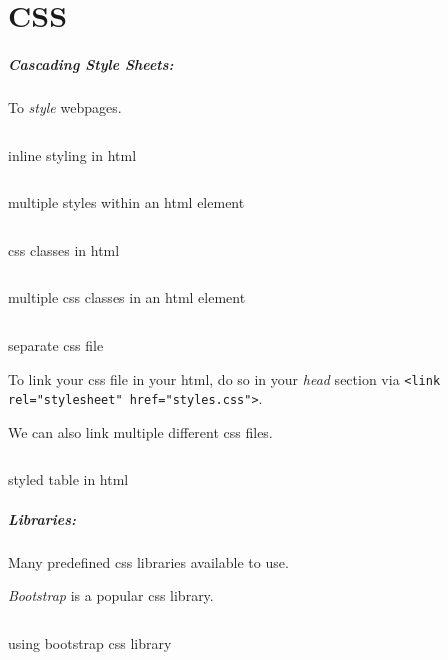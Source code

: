 \chapter{CSS}
\paragraph{Cascading Style Sheets:} To \emph{style} webpages.

\begin{code}
	\inputminted{html}{codes/web/css/css0.html}
	\caption{inline styling in html}
\end{code}

\clearpage
\begin{code}
	\inputminted{html}{codes/web/css/css1.html}
	\caption{multiple styles within an html element}
\end{code}

\begin{code}
	\inputminted{html}{codes/web/css/css2.html}
	\caption{css classes in html}
\end{code}

\begin{code}
	\inputminted{html}{codes/web/css/css3.html}
	\caption{multiple css classes in an html element}
\end{code}

\clearpage
\begin{code}
	\inputminted{css}{codes/web/css/css3.css}
	\caption{separate css file}
\end{code}

\begin{remark}
	To link your css file in your html, do so in your \emph{head} section
	via \texttt{<link rel="stylesheet" href="styles.css">}.
\end{remark}
\begin{remark}
	We can also link multiple different css files.
\end{remark}

\begin{code}
	\inputminted{html}{codes/web/css/table.html}
	\caption{styled table in html}
\end{code}

\clearpage
\paragraph{Libraries:} Many predefined css libraries available to use.
\begin{remark}
	\emph{Bootstrap} is a popular css library.
\end{remark}

\begin{code}
	\inputminted{html}{codes/web/css/bootstrap.html}
	\caption{using bootstrap css library}
\end{code}